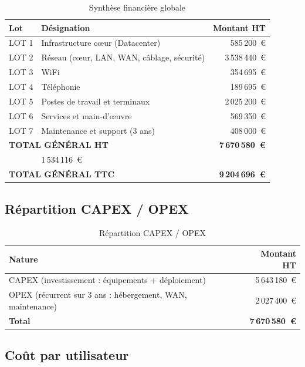 \documentclass[12pt,a4paper]{report}
\begin{document}
\begin{table}[H]
\centering
\renewcommand{\arraystretch}{1.3}
\begin{tabular}{llr}
\toprule
\textbf{Lot} & \textbf{Désignation} & \textbf{Montant HT} \\
\midrule
LOT 1 & Infrastructure c\oe ur (Datacenter) & 585\,200~\euro{} \\
LOT 2 & Réseau (c\oe ur, LAN, WAN, câblage, sécurité) & 3\,538\,440~\euro{} \\
LOT 3 & WiFi & 354\,695~\euro{} \\
LOT 4 & Téléphonie & 189\,695~\euro{} \\
LOT 5 & Postes de travail et terminaux & 2\,025\,200~\euro{} \\
LOT 6 & Services et main-d'\oe uvre & 569\,350~\euro{} \\
LOT 7 & Maintenance et support (3 ans) & 408\,000~\euro{} \\
\midrule
\multicolumn{2}{l}{\textbf{TOTAL GÉNÉRAL HT}} & \textbf{7\,670\,580~\euro{}} \\
\addlinespace
\multicolumn{2}{l}{TVA (20\%)} & 1\,534\,116~\euro{} \\
\midrule
\multicolumn{2}{l}{\textbf{TOTAL GÉNÉRAL TTC}} & \textbf{9\,204\,696~\euro{}} \\
\bottomrule
\end{tabular}
\caption{Synthèse financière globale}
\label{tab:synthese_prix}
\end{table}

\subsection{Répartition CAPEX / OPEX}

\begin{table}[H]
\centering
\begin{tabular}{lr}
\toprule
\textbf{Nature} & \textbf{Montant HT} \\
\midrule
CAPEX (investissement : équipements + déploiement) & 5\,643\,180~\euro{} \\
OPEX (récurrent sur 3 ans : hébergement, WAN, maintenance) & 2\,027\,400~\euro{} \\
\midrule
\textbf{Total} & \textbf{7\,670\,580~\euro{}} \\
\bottomrule
\end{tabular}
\caption{Répartition CAPEX / OPEX}
\label{tab:capex_opex}
\end{table}

\subsection{Coût par utilisateur}
\end{document}
